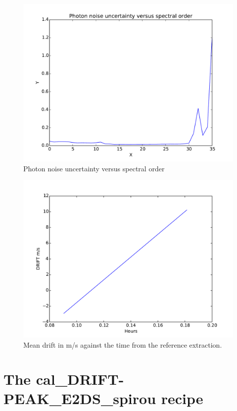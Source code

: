 \begin{figure}
\begin{center}
\includegraphics[width=.8\textwidth]{figures/cal_DRIFT_E2DS_spirou_2.pdf}
\caption{Photon noise uncertainty versus spectral order
 \label{figure_cal_drift_e2ds_spirou_2}}
\end{center}
\end{figure}


\begin{figure}
\begin{center}
\includegraphics[width=.8\textwidth]{figures/cal_DRIFT_E2DS_spirou_3.pdf}
\caption{Mean drift in m/s against the time from the reference extraction. \label{figure_cal_drift_e2ds_spirou_3}}
\end{center}
\end{figure}

\clearpage
\newpage
\section{The cal\_DRIFT-PEAK\_E2DS\_spirou recipe}
\label{section:cal_drift-peak_e2ds}

